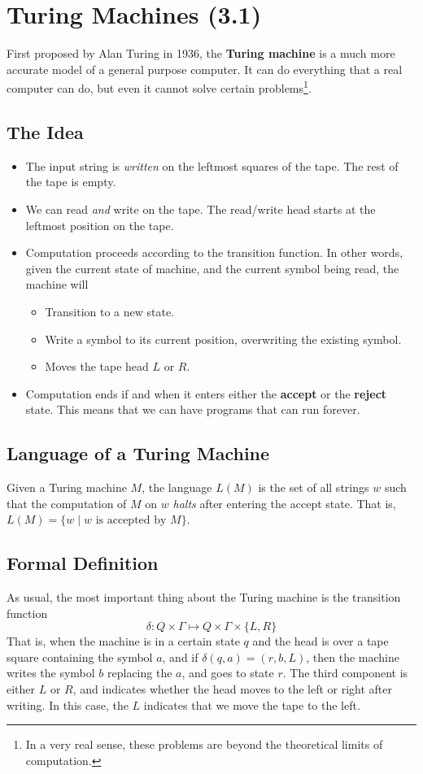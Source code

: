 \documentclass[letterpaper]{article}
\begin{document}
\newpage 
\section{Turing Machines (3.1)}
First proposed by Alan Turing in 1936, the \textbf{Turing machine} is a much more accurate model of a general purpose computer. It can do everything that a real computer can do, but even it cannot solve certain problems\footnote{In a very real sense, these problems are beyond the theoretical limits of computation.}.

\subsection{The Idea}
\begin{itemize}
    \item The input string is \emph{written} on the leftmost squares of the tape. The rest of the tape is empty. 
    \item We can read \emph{and} write on the tape. The read/write head starts at the leftmost position on the tape. 
    \item Computation proceeds according to the transition function. In other words, given the current state of machine, and the current symbol being read, the machine will 
    \begin{itemize}
        \item Transition to a new state.
        \item Write a symbol to its current position, overwriting the existing symbol.
        \item Moves the tape head $L$ or $R$. 
    \end{itemize}
    \item Computation ends if and when it enters either the \textbf{accept} or the \textbf{reject} state. This means that we can have programs that can run forever. 
\end{itemize}

\subsection{Language of a Turing Machine}
Given a Turing machine $M$, the language $L(M)$ is the set of all strings $w$ such that the computation of $M$ on $w$ \emph{halts} after entering the accept state. That is, $L(M) = \{w \mid w \text{ is accepted by } M\}$.

\subsection{Formal Definition}
As usual, the most important thing about the Turing machine is the transition function 
\[\delta: Q \times \Gamma \mapsto Q \times \Gamma \times \{L, R\}\]
That is, when the machine is in a certain state $q$ and the head is over a tape square containing the symbol $a$, and if $\delta(q, a) = (r, b, L)$, then the machine writes the symbol $b$ replacing the $a$, and goes to state $r$. The third component is either $L$ or $R$, and indicates whether the head moves to the left or right after writing. In this case, the $L$ indicates that we move the tape to the left. 
\end{document}
